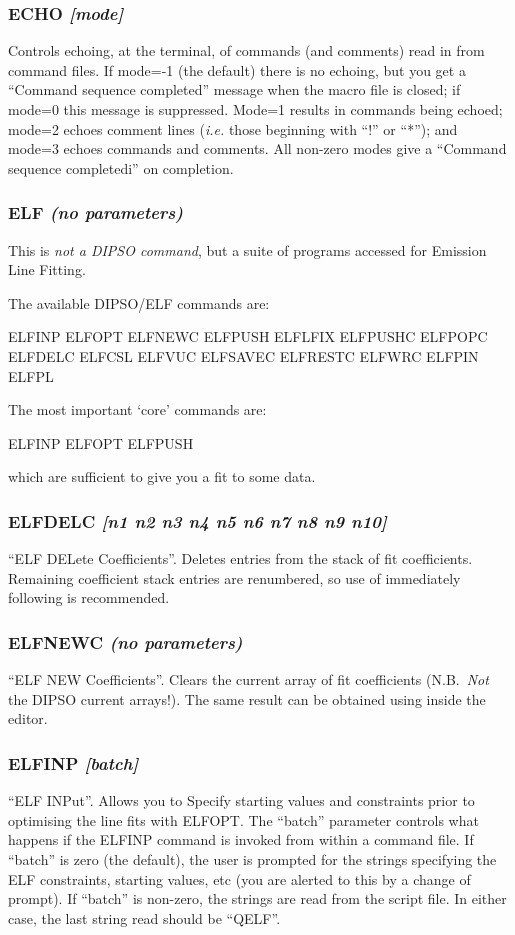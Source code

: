 \documentclass[twoside,11pt,noabs,nolof]{starlink}
\providecommand{\dipcom}[3]{\subsubsection*{\label{COM:#1}\textbf{#1} \emph{#2}}}
\begin{document}
\dipcom{ECHO}{[mode]}{Controls echoing of commands within command files}
Controls echoing, at the terminal, of commands (and comments) read in
from command files. If mode=-1 (the default) there is no echoing, but
you get a ``Command sequence completed'' message when the macro file is
closed; if mode=0 this message is suppressed. Mode=1 results in
commands being echoed; mode=2 echoes comment lines (\emph{i.e.} those
beginning with ``!'' or ``*''); and mode=3 echoes commands and
comments. All non-zero modes give a ``Command sequence completedi''
on completion.

\dipcom{ELF}{(no parameters)}{A suite of programs for Emission Line Fitting}
This is \emph{not a DIPSO command}, but a suite of programs accessed for
Emission Line Fitting.

The available DIPSO/ELF commands are:

\begin{terminalv}
ELFINP   ELFOPT   ELFNEWC
ELFPUSH  ELFLFIX
ELFPUSHC ELFPOPC  ELFDELC ELFCSL ELFVUC
ELFSAVEC ELFRESTC ELFWRC
ELFPIN   ELFPL
\end{terminalv}

The most important `core' commands are:

\begin{terminalv}
ELFINP ELFOPT ELFPUSH
\end{terminalv}

which are sufficient to give you a fit to some data.

\dipcom{ELFDELC}{[n1 n2 n3 n4 n5 n6 n7 n8 n9 n10]}{Deletes entries in the ELF fit co-efficient stack}
``ELF DELete Coefficients''. Deletes entries from the stack of fit
coefficients. Remaining coefficient stack entries are renumbered, so
use of   immediately following   is recommended.

\dipcom{ELFNEWC}{(no parameters)}{Clears the ELF fit co-efficient stack}
``ELF NEW Coefficients''. Clears the current array of fit coefficients
(N.B.\ \emph{Not} the DIPSO current arrays!). The same result can be
obtained using   inside the   editor.

\dipcom{ELFINP}{[batch]}{Sets starting values and constraints for fitting emission lines}

``ELF INPut''. Allows you to Specify starting values and constraints
prior to optimising the line fits with ELFOPT. The ``batch'' parameter
controls what happens if the ELFINP command is invoked from within a
command file. If ``batch'' is zero (the default), the user is prompted for
the strings specifying the ELF constraints, starting values, etc (you are
alerted to this by a change of prompt). If ``batch'' is non-zero, the
strings are read from the script file. In either case, the last string
read should be ``QELF''.
\end{document}
